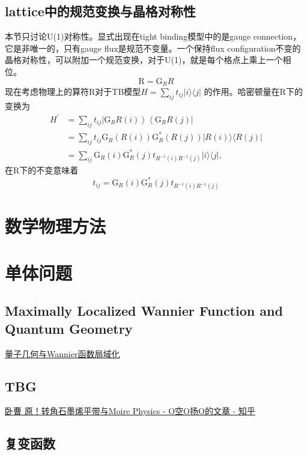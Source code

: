 \documentclass[10pt,openany]{book}
\theoremstyle{thmstyle} %
\theoremstyle{defstyle} %
\theoremstyle{prostyle} %
\begin{document}
\section{lattice中的规范变换与晶格对称性}
本节只讨论U(1)对称性。显式出现在tight binding模型中的是gauge connection，它是非唯一的，只有gauge flux是规范不变量。一个保持flux configuration不变的晶格对称性，可以附加一个规范变换，对于U(1)，就是每个格点上乘上一个相位。
\begin{equation*}
  \mathrm{R}=\mathrm{G}_R R
\end{equation*}
现在考虑物理上的算符$ \mathrm{R} $对于TB模型$ H=\sum_{i j} t_{i j}|i\rangle\langle j| $ 的作用。哈密顿量在$ \mathrm{R} $下的变换为
\begin{equation}
  \begin{aligned}
    H^{\prime} & =\sum_{i j} t_{i j}\left|\mathrm{G}_R R(i)\right\rangle\left\langle\mathrm{G}_R R(j)\right| \\
    & =\sum_{i j} t_{i j} \mathrm{G}_R(R(i)) \mathrm{G}_R^*(R(j))|R(i)\rangle\langle R(j)| \\
    & =\sum_{i j} \mathrm{G}_R(i) \mathrm{G}_R^*(j) t_{R^{-1}(i) R^{-1}(j)}|i\rangle\langle j|,
    \end{aligned}
\end{equation} 
在$ \mathrm{R} $下的不变意味着
\begin{equation}
  t_{i j}=\mathrm{G}_R(i) \mathrm{G}_R^*(j) t_{R^{-1}(i) R^{-1}(j)}
\end{equation}

\chapter{数学物理方法}
\chapter{单体问题}
\section{Maximally Localized Wannier Function and Quantum Geometry}
\href{https://zhuanlan.zhihu.com/p/629079639}{量子几何与Wannier函数局域化}
\section{TBG}
\href{https://zhuanlan.zhihu.com/p/675627432}{卧曹 原！转角石墨烯平带与Moire Physics - O空O扬O的文章 - 知乎
}
\section{复变函数}
\end{document}
